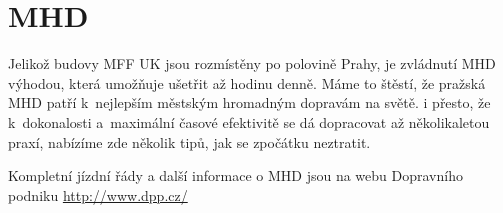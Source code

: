 \section{MHD}

Jelikož budovy MFF UK jsou rozmístěny po polovině Prahy, je
zvládnutí MHD výhodou, která umožňuje ušetřit až hodinu denně.
Máme to štěstí, že pražská MHD patří k~nejlepším městským
hromadným dopravám na světě. i přesto, že k~dokonalosti
a~maximální časové efektivitě se dá dopracovat až několikaletou
praxí, nabízíme zde několik tipů, jak se zpočátku neztratit.


Kompletní jízdní řády a další informace o MHD jsou na webu
Dopravního podniku \url{http://www.dpp.cz/}
